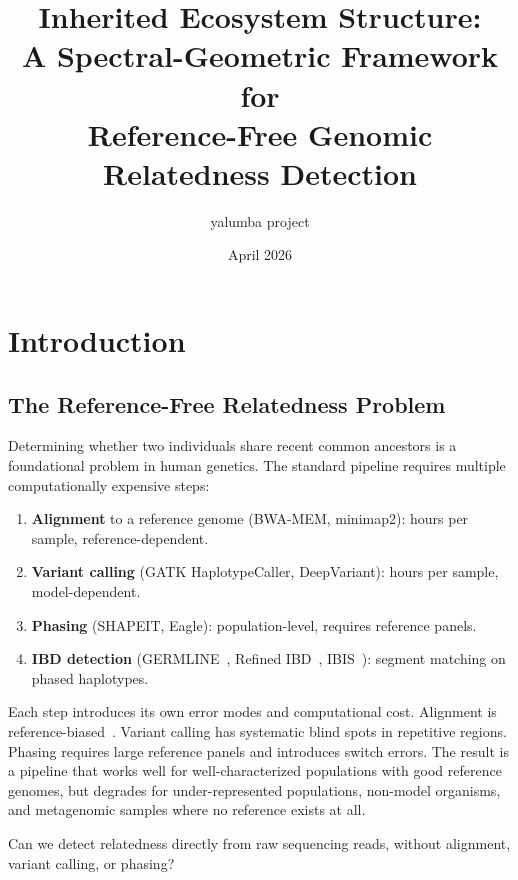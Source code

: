 \documentclass{../yalumba}
\title{Inherited Ecosystem Structure:\\A Spectral-Geometric Framework for\\Reference-Free Genomic Relatedness Detection}
\author{yalumba project}
\date{April 2026}
\begin{document}
\maketitle

\tableofcontents
\newpage


\section{Introduction}
\label{sec:intro}

\subsection{The Reference-Free Relatedness Problem}
\label{sec:intro:problem}

Determining whether two individuals share recent common ancestors is a
foundational problem in human genetics.  The standard pipeline requires
multiple computationally expensive steps:

\begin{enumerate}
  \item \textbf{Alignment} to a reference genome (BWA-MEM, minimap2):
    hours per sample, reference-dependent.
  \item \textbf{Variant calling} (GATK HaplotypeCaller, DeepVariant):
    hours per sample, model-dependent.
  \item \textbf{Phasing} (SHAPEIT, Eagle): population-level, requires
    reference panels.
  \item \textbf{IBD detection} (GERMLINE~\cite{gusev2009germline},
    Refined IBD~\cite{browning2013refinedibd},
    IBIS~\cite{browning2020ibis}): segment matching on phased haplotypes.
\end{enumerate}

Each step introduces its own error modes and computational cost.
Alignment is reference-biased~\cite{liao2025sv}.  Variant calling has
systematic blind spots in repetitive regions.  Phasing requires large
reference panels and introduces switch errors.  The result is a pipeline
that works well for well-characterized populations with good reference
genomes, but degrades for under-represented populations, non-model
organisms, and metagenomic samples where no reference exists at all.

\begin{pullquote}
Can we detect relatedness directly from raw sequencing reads,
without alignment, variant calling, or phasing?
\end{pullquote}
\end{document}
